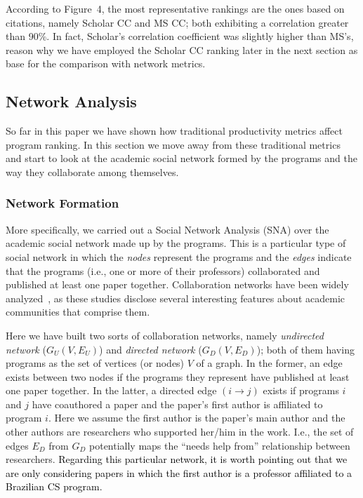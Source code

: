 \documentclass[10pt]{article}
\newcommand{\pedro}[1]{\textcolor{black}{#1}}
\begin{document}
According to Figure~4, the most representative rankings
are the ones based on citations, namely Scholar CC and MS CC; both exhibiting a
correlation greater than 90\%. 
In fact, Scholar's correlation coefficient was slightly
higher than MS's, reason why we have employed the Scholar CC ranking later 
 in the next section
as base for the comparison with network metrics.


\subsection*{Network Analysis}
\label{sec:network}

So far in this paper 
we have shown how traditional productivity metrics affect program ranking. In
this section we move away from these traditional metrics and start to look at the academic social network formed by the programs
and the way they collaborate among themselves. 

\subsubsection*{Network Formation}

More specifically, we carried out a Social Network Analysis (SNA) over the academic social network made up by the programs.
This is a particular type of social network in which the {\em nodes} represent the programs and the {\em edges} indicate that
the programs (i.e., one or more of their professors) collaborated and published at least one paper together. Collaboration
networks have been widely analyzed~\cite{newman2004cna}, as these studies disclose several interesting features about
academic communities that comprise them.

Here we have built two sorts of collaboration networks, namely {\em undirected network}
($G_U(V,E_U)$) and {\em directed network}  ($G_D(V,E_D)$); both of them having programs as the
set of vertices (or nodes) $V$ of a graph.
In the former, an edge exists between two nodes if the programs they represent have
published at least one paper together. 
In the latter, a directed edge $(i\rightarrow j)$ exists if programs $i$ and $j$ have
coauthored a paper and the paper's first author is affiliated to program $i$. Here we
assume the first author is the paper's main author and the other authors are
researchers who supported her/him in the work. 
I.e., the set of edges $E_D$ from $G_D$
potentially maps the ``needs help from'' relationship between researchers. \pedro{Regarding this particular network, it is worth pointing out that we are only considering papers in which the first author is a professor affiliated to a Brazilian CS program.}
\end{document}
